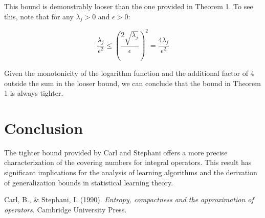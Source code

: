 \documentclass{article}
\begin{document}
This bound is demonstrably looser than the one provided in Theorem 1. To see this, note that for any $\lambda_j > 0$ and $\epsilon > 0$:

\begin{equation}
\frac{\lambda_j}{\epsilon^2} \leq \left(\frac{2\sqrt{\lambda_j}}{\epsilon}\right)^2 = \frac{4\lambda_j}{\epsilon^2}
\end{equation}

Given the monotonicity of the logarithm function and the additional factor of 4 outside the sum in the looser bound, we can conclude that the bound in Theorem 1 is always tighter.

\section{Conclusion}

The tighter bound provided by Carl and Stephani offers a more precise characterization of the covering numbers for integral operators. This result has significant implications for the analysis of learning algorithms and the derivation of generalization bounds in statistical learning theory.


\begin{thebibliography}{9}

Carl, B., \& Stephani, I. (1990). 
\textit{Entropy, compactness and the approximation of operators}. 
Cambridge University Press.

\end{thebibliography}
\end{document}
